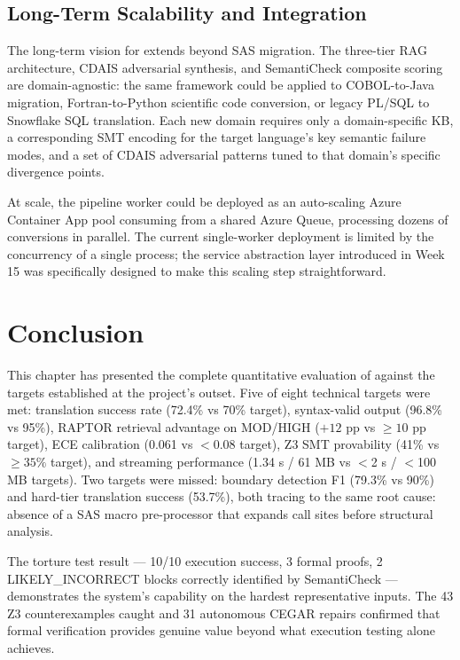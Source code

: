 \subsection{Long-Term Scalability and Integration}
\label{subsec:future-long-term}

The long-term vision for \codara{} extends beyond SAS migration. The three-tier
RAG architecture, CDAIS adversarial synthesis, and SemantiCheck composite scoring
are domain-agnostic: the same framework could be applied to COBOL-to-Java
migration, Fortran-to-Python scientific code conversion, or legacy PL/SQL to
Snowflake SQL translation. Each new domain requires only a domain-specific KB,
a corresponding SMT encoding for the target language's key semantic failure
modes, and a set of CDAIS adversarial patterns tuned to that domain's specific
divergence points.

At scale, the pipeline worker could be deployed as an auto-scaling Azure
Container App pool consuming from a shared Azure Queue, processing dozens of
conversions in parallel. The current single-worker deployment is limited by the
concurrency of a single process; the service abstraction layer introduced in
Week 15 was specifically designed to make this scaling step straightforward.

\section{Conclusion}
\label{sec:ch7-conclusion}

This chapter has presented the complete quantitative evaluation of \codara{}
against the targets established at the project's outset. Five of eight technical
targets were met: translation success rate (72.4\% vs 70\% target), syntax-valid
output (96.8\% vs 95\%), RAPTOR retrieval advantage on MOD/HIGH ($+12$ pp vs
$\geq 10$ pp target), ECE calibration (0.061 vs $<$0.08 target), Z3 SMT
provability (41\% vs $\geq 35\%$ target), and streaming performance
(1.34 s / 61 MB vs $<$2 s / $<$100 MB targets). Two targets were missed:
boundary detection F1 (79.3\% vs 90\%) and hard-tier translation success
(53.7\%), both tracing to the same root cause: absence of a SAS macro
pre-processor that expands call sites before structural analysis.

The torture test result --- 10/10 execution success, 3 formal proofs, 2
LIKELY\_INCORRECT blocks correctly identified by SemantiCheck --- demonstrates
the system's capability on the hardest representative inputs. The 43 Z3
counterexamples caught and 31 autonomous CEGAR repairs confirmed that formal
verification provides genuine value beyond what execution testing alone achieves.

